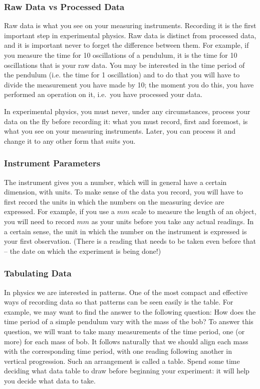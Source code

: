 \subsubsection{Raw Data vs Processed Data}

Raw data is what you see on your measuring instruments. Recording it is the first important step in experimental physics. Raw data is distinct from processed data, and it is important never to forget the difference between them. For example, if you measure the time for 10 oscillations of a pendulum, it is the time for 10 oscillations that is your raw data. You may be interested in the time period of the pendulum (i.e. the time for 1 oscillation) and to do that you will have to divide the measurement you have made by 10; the moment you do this, you have performed an operation on it, i.e.\ you have processed your data. 
\begin{imp}
In experimental physics, you must never, under any circumstances, process your data on the fly before recording it: what you must record, first and foremost, is what you see on your measuring instruments. Later, you can process it and change it to any other form that suits you. 
\end{imp}

\subsubsection{Instrument Parameters}

The instrument gives you a number, which will in general have a certain dimension, with units. To make sense of the data you record, you will have to first record the units in which the numbers on the measuring device are expressed. For example, if you use a $mm$ scale to measure the length of an object, you will need to record $mm$ as your units before you take any actual readings. In a certain sense, the unit in which the number on the instrument is expressed is your first observation. (There is a reading that needs to be taken even before that -- the date on which the experiment is being done!)

\subsubsection{Tabulating Data}

In physics we are interested in patterns. One of the most compact and effective ways of recording data so that patterns can be seen easily is the table. For example, we may want to find the answer to the following question: How does the time period of a simple pendulum vary with the mass of the bob? To answer this question, we will want to take many measurements of the time period, one (or more) for each mass of bob. It follows naturally that we should align each mass with the corresponding time period, with one reading following another in vertical progression. Such an arrangement is called a table. Spend some time deciding what data table to draw before beginning your experiment: it will help you decide what data to take.

